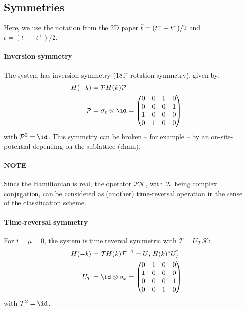 \subsection{Symmetries}
Here, we use the notation from the 2D paper $\bar{t} = (t^-+t^+)/2$ and $t=(t^--t^+)/2$.
\paragraph{Inversion symmetry}
The system has inversion symmetry ($180^\circ$ rotation symmetry), given by:
\begin{align}
    H(-k) &= \mathcal{P} H(k) \mathcal{P} \\
    \mathcal{P} &= \sigma_x \otimes \id =
    \begin{pmatrix}
        0 & 0 & 1 & 0 \\
        0 & 0 & 0 & 1 \\
        1 & 0 & 0 & 0 \\
        0 & 1 & 0 & 0
    \end{pmatrix}
\end{align}
with $\mathcal{P}^2=\id$.
This symmetry can be broken -- for example -- by an on-site-potential depending on the sublattice (chain).

\paragraph{NOTE} Since the Hamiltonian is real, the operator $\mathcal{P}\mathcal{K}$, with $\mathcal{K}$ being complex
conjugation, can be considered as (another) time-reversal operation in the sense of the
classification scheme.


\paragraph{Time-reversal symmetry}
For $t=\mu=0$, the system is time reversal symmetric with $\mathcal{T}=U_\mathcal{T} \mathcal{K}$:
\begin{align}
    H(-k)&=\mathcal{T} H(k) \mathcal{T}^{-1} = U_\mathcal{T}H(k)^* U_\mathcal{T}^\dagger \\
    U_\mathcal{T} &= \id \otimes \sigma_x =
    \begin{pmatrix}
        0 & 1 & 0 & 0 \\
        1 & 0 & 0 & 0 \\
        0 & 0 & 0 & 1 \\
        0 & 0 & 1 & 0
    \end{pmatrix}
\end{align}
with $\mathcal{T}^2=\id$.


